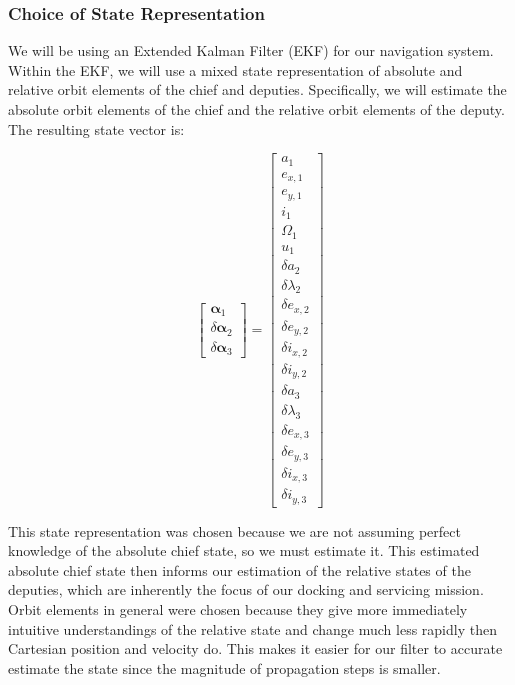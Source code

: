 \subsubsection{Choice of State Representation} \label{sec:nav_state_rep}
We will be using an Extended Kalman Filter (EKF) for our navigation system. Within the EKF, we will use a mixed state representation of absolute and relative orbit elements of the chief and deputies. Specifically, we will estimate the absolute orbit elements of the chief and the relative orbit elements of the deputy. The resulting state vector is:

\begin{equation}
\begin{bmatrix}
\boldsymbol{\alpha}_1 \\
\hline
\delta \boldsymbol{\alpha}_2 \\
\hline
\delta \boldsymbol{\alpha}_3
\end{bmatrix}
=
\begin{bmatrix}
a_1 \\
e_{x,1} \\
e_{y,1} \\
i_1 \\
\Omega_1 \\
u_1 \\
\hline
\delta a_2 \\
\delta \lambda_2 \\
\delta e_{x,2} \\
\delta e_{y,2} \\
\delta i_{x,2} \\
\delta i_{y,2} \\
\hline
\delta a_3 \\
\delta \lambda_3 \\
\delta e_{x,3} \\
\delta e_{y,3} \\
\delta i_{x,3} \\
\delta i_{y,3}
\end{bmatrix}
\end{equation}

This state representation was chosen because we are not assuming perfect knowledge of the absolute chief state, so we must estimate it. This estimated absolute chief state then informs our estimation of the relative states of the deputies, which are inherently the focus of our docking and servicing mission. Orbit elements in general were chosen because they give more immediately intuitive understandings of the relative state and change much less rapidly then Cartesian position and velocity do. This makes it easier for our filter to accurate estimate the state since the magnitude of propagation steps is smaller. 

